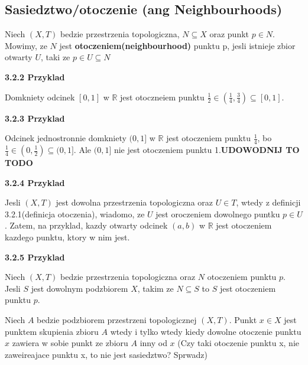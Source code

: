 \documentclass{article}
\begin{document}
\subsection{Sasiedztwo/otoczenie (ang Neighbourhoods)}

\begin{tcolorbox}[colback=white!90!red,colframe=black!35!red,title=3.2.1 Definicja: Otoczenie/sasiedztwo]

Niech $(X,T)$ bedzie przestrzenia topologiczna, $N \subseteq X$ oraz punkt $p\in N$. Mowimy, ze $N$ jest \textbf{otoczeniem(neighbourhood)} punktu p, jesli istnieje zbior otwarty $U$, taki ze $p\in U \subseteq N$

\end{tcolorbox}

\textbf{3.2.2 Przyklad}

Domkniety odcinek $[0,1]$ w $\mathbb{R}$ jest otoczneiem punktu $\frac{1}{2} \in (\frac{1}{4}, \frac{3}{4}) \subseteq [0,1]$.

\textbf{3.2.3 Przyklad}

Odcinek jednostronnie domkniety $(0,1]$ w $\mathbb{R}$ jest otoczeniem punktu $\frac{1}{4}$, bo $\frac{1}{4} \in (0, \frac{1}{2}) \subseteq (0,1]$. Ale $(0,1]$ nie jest otoczeniem punktu 1.\textbf{UDOWODNIJ TO TODO} 

\textbf{3.2.4 Przyklad}

Jesli $(X,T)$ jest dowolna przestrzenia topologiczna oraz $U \in T$, wtedy z definicji 3.2.1(definicja otoczenia), wiadomo, ze $U$ jest oroczeniem dowolnego puntku $p\in U$. Zatem, na przyklad, kazdy otwarty odcinek $(a,b)$ w $\mathbb{R}$ jest otoczeniem kazdego punktu, ktory w nim jest.

\textbf{3.2.5 Przyklad}

Niech $(X,T)$ bedzie przestrzenia topologiczna oraz $N$ otoczeniem punktu $p$. Jesli $S$ jest dowolnym podzbiorem $X$, takim ze $N \subseteq S$ to $S$ jest otoczeniem punktu $p$.

\begin{tcolorbox}[colback=white!90!green,colframe=black!35!green,title=3.2.6 Lematokomentarz: Punkt skupienia a otoczenie.]
    Niech $A$ bedzie podzbiorem przestrzeni topologicznej $(X,T)$. Punkt $x\in X$ jest punktem skupienia zbioru $A$ wtedy i tylko wtedy kiedy dowolne otoczenie punktu $x$ zawiera w sobie punkt ze zbioru $A$ inny od $x$ (Czy taki otoczenie punktu x, nie zaweireajace punktu x, to nie jest sasiedztwo? Sprwadz)

\end{tcolorbox}
\end{document}
